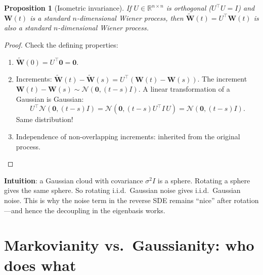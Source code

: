 \documentclass[11pt,a4paper]{article}
\newtheorem{proposition}[theorem]{Proposition}
\newcommand{\R}{\mathbb{R}}
\begin{document}
\begin{proposition}[Isometric invariance]
If $U \in \R^{n \times n}$ is orthogonal ($U^\top U = I$) and $\mathbf{W}(t)$ is a standard $n$-dimensional Wiener process, then $\tilde{\mathbf{W}}(t) = U^\top\mathbf{W}(t)$ is also a standard $n$-dimensional Wiener process.
\end{proposition}

\begin{proof}
Check the defining properties:
\begin{enumerate}[nosep]
  \item $\tilde{\mathbf{W}}(0) = U^\top\mathbf{0} = \mathbf{0}$.  \checkmark
  \item Increments: $\tilde{\mathbf{W}}(t) - \tilde{\mathbf{W}}(s) = U^\top(\mathbf{W}(t) - \mathbf{W}(s))$.  The increment $\mathbf{W}(t) - \mathbf{W}(s) \sim \mathcal{N}(\mathbf{0}, (t-s)I)$.  A linear transformation of a Gaussian is Gaussian:
  \begin{equation}
    U^\top\mathcal{N}(\mathbf{0}, (t-s)I) = \mathcal{N}(\mathbf{0}, (t-s)U^\top I\, U) = \mathcal{N}(\mathbf{0}, (t-s)I).
  \end{equation}
  Same distribution!  \checkmark
  \item Independence of non-overlapping increments: inherited from the original process.  \checkmark
\end{enumerate}
\end{proof}

\textbf{Intuition}: a Gaussian cloud with covariance $\sigma^2 I$ is a sphere.  Rotating a sphere gives the same sphere.  So rotating i.i.d.\ Gaussian noise gives i.i.d.\ Gaussian noise.  This is why the noise term in the reverse SDE remains ``nice'' after rotation---and hence the decoupling in the eigenbasis works.


\section{Markovianity vs.\ Gaussianity: who does what}
\label{sec:q26}
\end{document}
